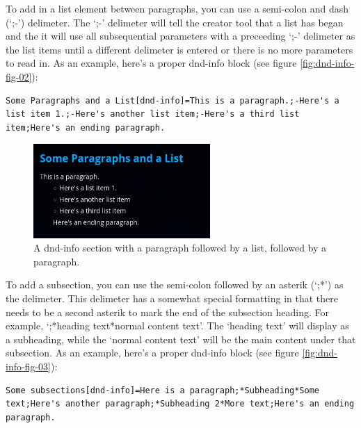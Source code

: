 To add in a list element between paragraphs, you can use a semi-colon and dash (`;-') delimeter. The `;-' delimeter will tell the creator tool that a list has began and the it will use all subsequential parameters with a preceeding `;-' delimeter as the list items until a different delimeter is entered or there is no more parameters to read in. As an example, here's a proper dnd-info block (see figure \ref{fig:dnd-info-fig-02}):

\begin{lstlisting}
Some Paragraphs and a List[dnd-info]=This is a paragraph.;-Here's a list item 1.;-Here's another list item;-Here's a third list item;Here's an ending paragraph.
\end{lstlisting}

\begin{figure}[h]
	\centering
	\includegraphics[width=0.6\textwidth]{images/dnd-info-section-02.png}
	\caption{A dnd-info section with a paragraph followed by a list, followed by a paragraph.}
	\label{fig:dnd-info-fig-2}
\end{figure}

To add a subsection, you can use the semi-colon followed by an asterik (`;*') as the delimeter. This delimeter has a somewhat special formatting in that there needs to be a second asterik to mark the end of the subsection heading. For example, `;*heading text*normal content text'. The `heading text' will display as a subheading, while the `normal content text' will be the main content under that subsection. As an example, here's a proper dnd-info block (see figure \ref{fig:dnd-info-fig-03}):

\begin{lstlisting}
Some subsections[dnd-info]=Here is a paragraph;*Subheading*Some text;Here's another paragraph;*Subheading 2*More text;Here's an ending paragraph.
\end{lstlisting}

